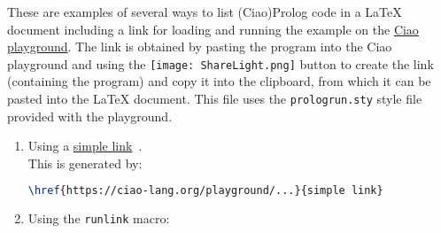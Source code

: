 \documentclass{article}
\begin{document}
\vspace*{-5mm}
\thispagestyle{empty}

\noindent
These are examples of several ways to list (Ciao)Prolog code in a
LaTeX document including a link for loading and running the
example on the \href{https://ciao-lang.org/playground}{Ciao
  playground}. The link is obtained by pasting the program into the
Ciao playground and using the
\texttt{[image: ShareLight.png]} button to
create the link (containing the program) and copy it into the
clipboard, from which it can be pasted into the LaTeX
document. This file uses the \texttt{prologrun.sty} style file provided with the playground.\\ [-3mm]

\begin{enumerate}

\item Using a
  \href{https://ciao-lang.org/playground/?code=app(%5B%5D%2CX%2CX).%0Aapp(%5BX%7CY%5D%2CZ%2C%5BX%7CW%5D)%20%3A-%0A%20%20%20%20%20app(Y%2CZ%2CW).%0A}
    {simple link}\ .
\ \\
This is generated by: 
\begin{lstlisting}[language=TeX,basicstyle=\small\ttfamily]
\href{https://ciao-lang.org/playground/...}{simple link}
\end{lstlisting}

\bigskip
\item Using the \texttt{runlink} macro: 
  \runlink{https://ciao-lang.org/playground/?code=app(%
\ \\
This is generated by: 
\begin{lstlisting}[language=TeX,basicstyle=\small\ttfamily]
\runlink{https://ciao-lang.org/playground/...}
\end{lstlisting}

\bigskip
\item Using the \texttt{runlink} macro before a standard code area:
\hfill \runlink{https://ciao-lang.org/playground/?code=app(%
\begin{prolog}
append([],X,X).
append([X|Y],Z,[X|W]) :-
     append(Y,Z,W).
\end{prolog}
\ \\
This is generated by: 
\begin{lstlisting}[language=TeX,basicstyle=\small\ttfamily]
\hfill \runlink{https://ciao-lang.org/playground/...}
\begin{prolog}
append([],X,X).
append([X|Y],Z,[X|W]) :-
     append(Y,Z,W).
\end{prolog}
\end{lstlisting}

}}
\end{enumerate}
\end{document}
